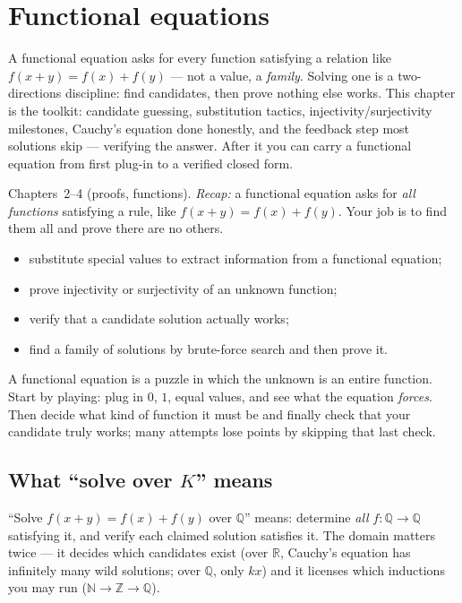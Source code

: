 \chapter{Functional equations}

A functional equation asks for
every function satisfying a relation like $f(x+y)=f(x)+f(y)$ --- not a
value, a \emph{family}. Solving one is a two-directions discipline: find
candidates, then prove nothing else works. This chapter is the toolkit:
candidate guessing, substitution tactics, injectivity/surjectivity
milestones, Cauchy's equation done honestly, and the feedback step most
solutions skip --- verifying the answer. After it you can carry a
functional equation from first plug-in to a verified closed form.

\begin{rulebox}
Chapters~2--4 (proofs, functions). \emph{Recap:} a functional equation asks for \emph{all functions} satisfying a rule, like $f(x+y)=f(x)+f(y)$. Your job is to find them all and prove there are no others.
\end{rulebox}
\begin{wins}
\begin{itemize}
\item substitute special values to extract information from a functional equation;
\item prove injectivity or surjectivity of an unknown function;
\item verify that a candidate solution actually works;
\item find a family of solutions by brute-force search and then prove it.
\end{itemize}
\end{wins}
\begin{principle}
A functional equation is a puzzle in which the unknown is an entire function. Start by playing: plug in $0$, $1$, equal values, and see what the equation \emph{forces}. Then decide what kind of function it must be and finally check that your candidate truly works; many attempts lose points by skipping that last check.
\end{principle}

\section{What ``solve over $K$'' means}
``Solve $f(x+y)=f(x)+f(y)$ over $\mathbb Q$'' means: determine
\emph{all} $f:\mathbb Q\to\mathbb Q$ satisfying it, and verify each
claimed solution satisfies it. The domain matters twice --- it decides
which candidates exist (over $\mathbb R$, Cauchy's equation has
infinitely many wild solutions; over $\mathbb Q$, only $kx$) and it
licenses which inductions you may run ($\mathbb N\to\mathbb Z\to\mathbb Q$).

